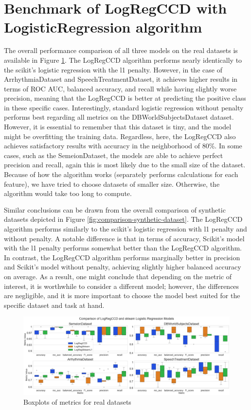 \documentclass[11pt]{article}
\begin{document}
\section{Benchmark of LogRegCCD with LogisticRegression algorithm}

The overall performance comparison of all three models on the real datasets is available in Figure \ref{fig:real-data-boxplots}. The LogRegCCD algorithm performs nearly identically to the scikit's logistic regression with the l1 penalty. However, in the case of ArrhythmiaDataset and SpeechTreatmentDataset, it achieves higher results in terms of ROC AUC, balanced accuracy, and recall while having slightly worse precision, meaning that the LogRegCCD is better at predicting the positive class in these specific cases. Interestingly, standard logistic regression without penalty performs best regarding all metrics on the DBWorldSubjectsDataset dataset. However, it is essential to remember that this dataset is tiny, and the model might be overfitting the training data. Regardless, here, the LogRegCCD also achieves satisfactory results with accuracy in the neighborhood of 80\%. In some cases, such as the SemeionDataset, the models are able to achieve perfect precision and recall, again this is most likely due to the small size of the dataset. Because of how the algorithm works (separately performs calculations for each feature), we have tried to choose datasets of smaller size. Otherwise, the algorithm would take too long to compute.\par

Similar conclusions can be drawn from the overall comparison of synthetic datasets depicted in Figure \ref{fig:comparison-synthetic-dataset}. The LogRegCCD algorithm performs similarly to the scikit's logistic regression with l1 penalty and without penalty. A notable difference is that in terms of accuracy, Scikit's model with the l1 penalty performs somewhat better than the LogRegCCD algorithm. In contrast, the LogRegCCD algorithm performs marginally better in precision and Scikit's model without penalty, achieving slightly higher balanced accuracy on average. As a result, one might conclude that depending on the metric of interest, it is worthwhile to consider a different model; however, the differences are negligible, and it is more important to choose the model best suited for the specific dataset and task at hand. \par


\begin{figure}[h]
    \centering
  \includegraphics[width=\textwidth]{../results/real_data_boxplots.png}
    \caption{Boxplots of metrics for real datasets}
    \label{fig:real-data-boxplots}
  \end{figure}
\end{document}
